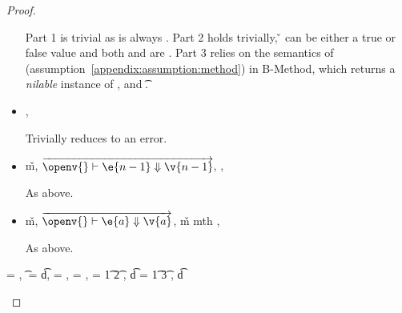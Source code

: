 \begin{lemma}
\begin{proof}
\begin{case}[T-MethodStatic]
\begin{itemize}
\begin{subcase}[B-Method]
Part 1 is trivial as \object{} is always \emptyobject{}.
Part 2 holds trivially, \v{} can be either a true or false value
and both {\thenprop{\prop{}}} and {\elseprop{\prop{}}}
are \topprop{}.
Part 3 relies on the semantics of \invokejavamethodliteral (assumption~\ref{appendix:assumption:method})
in B-Method, which returns a \emph{nilable} instance of ,
and  {\t{}}.
\end{subcase}

  \item[]
\begin{subcase}[BE-Method1]
  \opsem {\openv{}}
         {}
         {\errorval{\v{}}},
  \opsem {\openv{}}
         {\e{}}
         {\errorval{\v{}}}

         Trivially reduces to an error.
\end{subcase}
  \item[]
\begin{subcase}[BE-Method2]
  \opsem {\openv{}}
         {}
         {\v{m}},
 $\overrightarrow{
  \opsem {\openv{}}
         {\e{n-1}}
         {\v{n-1}}
       }$,
  \opsem {\openv{}}
         {}
         {\errorval{\v{}}},
  \opsem {\openv{}}
         {\e{}}
         {\errorval{\v{}}}

  As above.
\end{subcase}
  \item[]
\begin{subcase}[BE-Method3]
  \opsem {\openv{}}
         {}
         {\v{m}},
  $\overrightarrow{
  \opsem {\openv{}}
         {\e{a}}
         {\v{a}}
       }$,
   {\v{m}} {mth}
                    {} {}
                    {}
                    {\errorvalv{}},
  \opsem {\openv{}} {\e{}} {\errorvalv{}}

  As above.

\end{subcase}
\end{itemize}

\end{case}

\begin{case}[T-DefMulti]
  \e{} = {\createmultiexp {\s{}} {}},
  \t{} = {\MultiFntype {\s{}} {\t{d}}},
  \thenprop{\prop{}} = {\topprop{}},
  \elseprop{\prop{}} = {\botprop{}},
  \s{} = {\ArrowOne {\x{}} {\t{1}} {\t{2}}
                          {
                                      {}}
                          {}},
  \t{d} = {\ArrowOne {\x{}} {\t{1}} {\t{3}}
                          {
                                      {}}
                          {}},
  \judgementtwo {\propenv{}} {} {\t{d}}



\end{case}
\end{proof}
\end{lemma}
